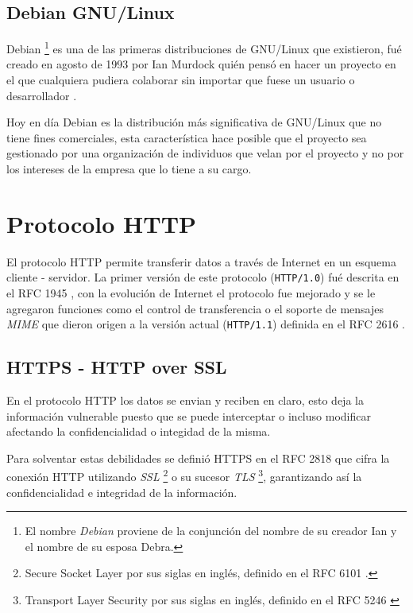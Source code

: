 
  \subsection {Debian GNU/Linux}

Debian \footnote{El nombre \textit{Debian} proviene de la conjunci\'{o}n del nombre de su creador Ian y el nombre de su esposa Debra.} es una de las primeras distribuciones de GNU/Linux que existieron, fu\'{e} creado en agosto de 1993 por Ian Murdock qui\'{e}n pens\'{o} en hacer un proyecto en el que cualquiera pudiera colaborar sin importar que fuese un usuario o desarrollador \cite{_debian_????}.

Hoy en d\'{i}a Debian es la distribuci\'{o}n m\'{a}s significativa de GNU/Linux que no tiene fines comerciales, esta caracter\'{i}stica hace posible que el proyecto sea gestionado por una organizaci\'{o}n de individuos que velan por el proyecto y no por los intereses de la empresa que lo tiene a su cargo.

\section {Protocolo HTTP}

El protocolo \textsc{HTTP} permite transferir datos a trav\'{e}s de Internet en un esquema cliente - servidor. La primer versi\'{o}n de este protocolo (\verb|HTTP/1.0|) fu\'{e} descrita en el \textsc{RFC} 1945 \cite{_rfc_????-1}, con la evoluci\'{o}n de Internet el protocolo fue mejorado y se le agregaron funciones como el control de transferencia o el soporte de mensajes \textit{MIME} que dieron origen a la versi\'{o}n actual (\verb|HTTP/1.1|) definida en el RFC 2616 \cite{_rfc_????}.

  \subsection {HTTPS - HTTP over SSL}

En el protocolo \textsc{HTTP} los datos se envian y reciben en claro, esto deja la informaci\'{o}n vulnerable puesto que se puede interceptar o incluso modificar afectando la confidencialidad o integidad de la misma.

Para solventar estas debilidades se defini\'{o} \textsc{HTTPS} en el \textsc{RFC} 2818 \cite{_rfc_????-6} que cifra la conexi\'{o}n \textsc{HTTP} utilizando \textit{SSL} \footnote{Secure Socket Layer por sus siglas en ingl\'{e}s, definido en el \textsc{RFC} 6101 \cite{_rfc_????-4}.} o su sucesor \textit{TLS} \footnote{Transport Layer Security por sus siglas en ingl\'{e}s, definido en el \textsc{RFC} 5246 \cite{_rfc_????-3}}, garantizando as\'{i} la confidencialidad e integridad de la informaci\'{o}n.

